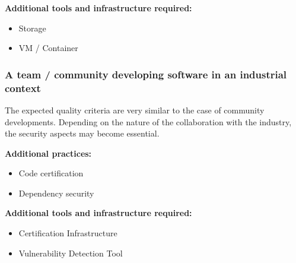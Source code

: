 {\bf Additional tools and infrastructure required:}
\begin{itemize}
\item Storage
\item VM / Container
\end{itemize}

\subsubsection{A team / community developing software in an industrial context}

The expected quality criteria are very similar to the case of
community developments. Depending on the nature of the collaboration
with the industry, the security aspects may become essential. 

{\bf Additional practices:}
\begin{itemize}
\item Code certification
\item Dependency security
\end{itemize}

{\bf Additional tools and infrastructure required:}
\begin{itemize}
\item Certification Infrastructure
\item Vulnerability Detection Tool
\end{itemize}

